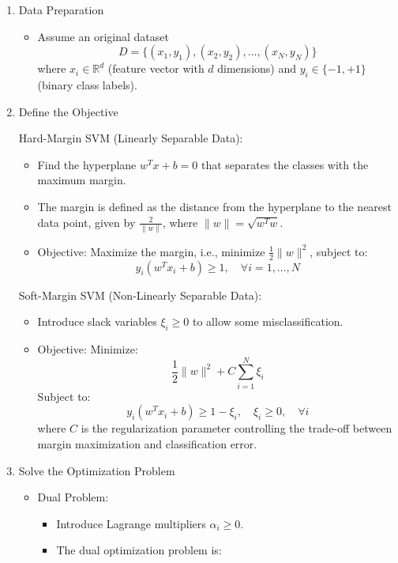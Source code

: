 \begin{enumerate}[label=Step \arabic*:, align=left, leftmargin=20pt,labelsep=1em]
    \item Data Preparation
    \begin{itemize}
        \item Assume an original dataset
            \[D = \{ (x_1, y_1), (x_2, y_2), \dots, (x_N, y_N) \}\]
            where $x_i \in \mathbb{R}^d$ (feature vector with $d$ dimensions) and $y_i \in \{-1, +1\}$ (binary class labels).
    \end{itemize}

    \item Define the Objective

    \smallskip
    Hard-Margin SVM (Linearly Separable Data):
    \begin{itemize}
        \item Find the hyperplane $w^T x + b = 0$ that separates the classes with the maximum margin.
        \item The margin is defined as the distance from the hyperplane to the nearest data point, given by $\frac{2}{\|w\|}$, where $\|w\| = \sqrt{w^T w}$.
        \item Objective: Maximize the margin, i.e., minimize $\frac{1}{2} \|w\|^2$, subject to:
            \[y_i (w^T x_i + b) \geq 1, \quad \forall i = 1, \dots, N\]
    \end{itemize}

    \smallskip
    Soft-Margin SVM (Non-Linearly Separable Data):
    \begin{itemize}
        \item Introduce slack variables $\xi_i \geq 0$ to allow some misclassification.
        \item Objective: Minimize:
            \[\frac{1}{2} \|w\|^2 + C \sum_{i=1}^N \xi_i\]
            Subject to:
            \[y_i (w^T x_i + b) \geq 1 - \xi_i, \quad \xi_i \geq 0, \quad \forall i\]
            where $C$ is the regularization parameter controlling the trade-off between margin maximization and classification error.
    \end{itemize}

    \item Solve the Optimization Problem

    \smallskip
    \begin{itemize}
        The optimization problem is typically solved in its \textbf{dual form} using Lagrange multipliers to handle constraints efficiently.
        \item Dual Problem:
        \begin{itemize}
            \item Introduce Lagrange multipliers $\alpha_i \geq 0$.
            \item The dual optimization problem is:
        \end{itemize}


\end{itemize}
\end{enumerate}
